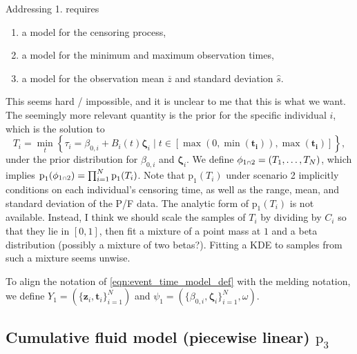 \documentclass[
  10pt,
  a4paper,
]{article}
\providecommand{\tightlist}{%
  \setlength{\itemsep}{0pt}\setlength{\parskip}{0pt}}
\let\Oldcap\cap
\renewcommand{\cap}{\mathrel{\mathsmaller{\Oldcap}}}
\newcommand{\pd}{\text{p}}
\begin{document}
Addressing 1. requires

\begin{enumerate}
\def\labelenumi{\alph{enumi}.}
\tightlist
\item
  a model for the censoring process,
\item
  a model for the minimum and maximum observation times,
\item
  a model for the observation mean \(\overline{z}\) and standard
  deviation \(\hat{s}\).
\end{enumerate}

This seems hard / impossible, and it is unclear to me that this is what
we want. The seemingly more relevant quantity is the prior for the
specific individual \(i\), which is the solution to \begin{equation}
  T_{i} = \min_{t} \left\{
    \tau_{i} = \beta_{0, i} + B_{i}(t)\boldsymbol{\zeta}_{i}
    \mid
    t \in [\max(0, \min(\boldsymbol{t_{i}})), \max(\boldsymbol{t_{i}})]
  \right\},
\end{equation} under the prior distribution for \(\beta_{0, i}\) and
\(\boldsymbol{\zeta}_{i}\). We define
\(\phi_{1 \cap 2} = (T_{1}, \ldots, T_{N})\), which implies
\(\pd_{1}(\phi_{1 \cap 2}) = \prod_{i = 1}^{N}\pd_{1}(T_{i})\). Note
that \(\pd_{1}(T_{i})\) under scenario 2 implicitly conditions on each
individual's censoring time, as well as the range, mean, and standard
deviation of the P/F data. The analytic form of \(\pd_{1}(T_{i})\) is
not available. Instead, I think we should scale the samples of \(T_{i}\)
by dividing by \(C_{i}\) so that they lie in \([0, 1]\), then fit a
mixture of a point mass at \(1\) and a beta distribution (possibly a
mixture of two betas?). Fitting a KDE to samples from such a mixture
seems unwise.

To align the notation of \eqref{eqn:event_time_model_def} with the
melding notation, we define
\(Y_{1} = (\{\boldsymbol{z}_{i}, \boldsymbol{t}_{i}\}_{i = 1}^{N})\) and
\(\psi_{1} = (\{\beta_{0, i}, \boldsymbol{\zeta}_{i}\}_{i = 1}^{N}, \omega)\).

\hypertarget{cumulative-fluid-model-piecewise-linear-pd_3}{%
\subsection{\texorpdfstring{Cumulative fluid model (piecewise linear)
\(\pd_{3}\)}{Cumulative fluid model (piecewise linear) \textbackslash pd\_\{3\}}}\label{cumulative-fluid-model-piecewise-linear-pd_3}}
\end{document}
